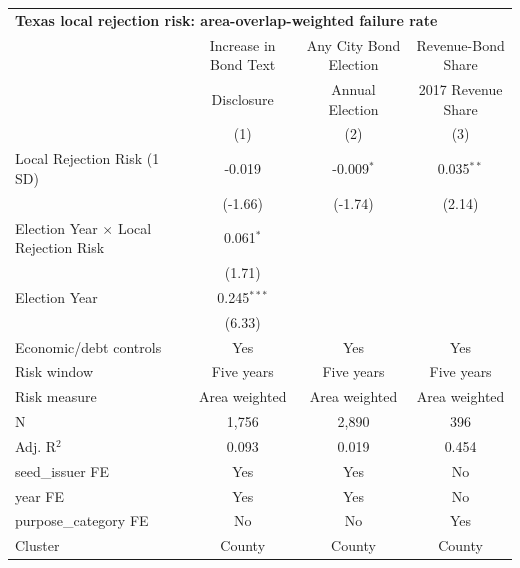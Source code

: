 \begingroup
\centering
\begin{tabular*}{\textwidth}{@{\extracolsep{\fill}}lccc}
\multicolumn{4}{l}{\textbf{Texas local rejection risk: area-overlap-weighted failure rate}}\\

\addlinespace
   \toprule
                                                & Increase in Bond Text & Any City Bond Election & Revenue-Bond Share\\
                                                & Disclosure            & Annual Election        & 2017 Revenue Share \\
                                                & (1)                   & (2)                    & (3)\\
   \midrule
   Local Rejection Risk (1 SD)                  & -0.019                & -0.009$^{*}$           & 0.035$^{**}$\\
                                                & (-1.66)              & (-1.74)               & (2.14)\\
   Election Year $\times$ Local Rejection Risk  & 0.061$^{*}$           &                        &   \\
                                                & (1.71)               &                        &   \\
   Election Year                                & 0.245$^{***}$         &                        &   \\
                                                & (6.33)               &                        &   \\
   Economic/debt controls                       & Yes                   & Yes                    & Yes\\
   Risk window                                  & Five years            & Five years             & Five years\\
   Risk measure                                 & Area weighted         & Area weighted          & Area weighted\\
   \hline
   N                                 & 1,756                 & 2,890                  & 396\\
   Adj. R$^2$                               & 0.093                 & 0.019                  & 0.454\\
   seed\_issuer FE                              & Yes                   & Yes                    & No\\
   year FE                                      & Yes                   & Yes                    & No\\
   purpose\_category FE                         & No                    & No                     & Yes\\
   Cluster              & County & County & County\\
   \bottomrule
\end{tabular*}
\par\endgroup
